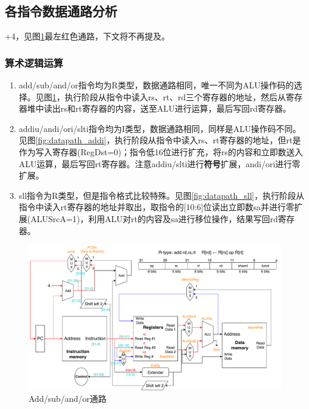
\subsection{各指令数据通路分析}
+4，见图\ref{fig:datapath_add}最左红色通路，下文将不再提及。
\subsubsection{算术逻辑运算}
\begin{enumerate}
	\item add/sub/and/or指令均为R类型，数据通路相同，唯一不同为ALU操作码的选择。见图\ref{fig:datapath_add}，执行阶段从指令中读入rs、rt、rd三个寄存器的地址，然后从寄存器堆中读出rs和rt寄存器的内容，送至ALU进行运算，最后写回rd寄存器。
	\item addiu/andi/ori/slti指令均为I类型，数据通路相同，同样是ALU操作码不同。见图\ref{fig:datapath_addi}，执行阶段从指令中读入rs、rt寄存器的地址，但rt是作为写入寄存器(RegDst=0)；指令低16位进行扩充，将rs的内容和立即数送入ALU运算，最后写回rt寄存器。注意addiu/slti进行\textbf{符号}扩展，andi/ori进行零扩展。
	\item sll指令为R类型，但是指令格式比较特殊。见图\ref{fig:datapath_sll}，执行阶段从指令中读入rt寄存器的地址并取出，取指令的[10:6]位读出立即数sa并进行零扩展(ALUSrcA=1)，利用ALU对rt的内容及sa进行移位操作，结果写回rd寄存器。
\end{enumerate}
\begin{figure}[htbp]
\centering
\includegraphics[width=\linewidth]{fig/Datapath_add.pdf}
\caption{Add/sub/and/or通路}
\label{fig:datapath_add}
\end{figure}
